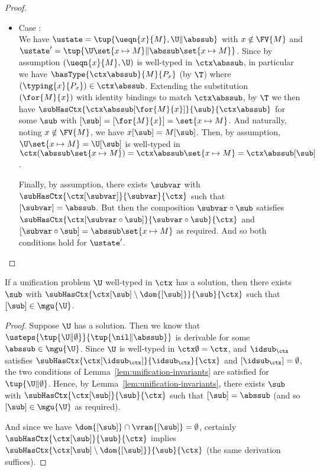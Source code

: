 \begin{proof}
\begin{itemize}
  \item Case : \\
  We have $\ustate = \tup{\ueqn{x}{M}, \U \| \abssub}$ with $x \notin \FV{M}$ and $\ustate' = \tup{\U \set{x \mapsto M} \| \abssub \set{x \mapsto M}}$.
  Since by assumption $(\ueqn{x}{M}, \U)$ is well-typed in $\ctx \abssub$, in particular we have $\hasType{\ctx \abssub}{M}{P_x}$ (by $\T$) where $(\typing{x}{P_x}) \in \ctx \abssub$.
  Extending the substitution $(\for{M}{x})$ with identity bindings to match $\ctx \abssub$, by $\T$ we then have $\subHasCtx{\ctx \abssub [\for{M}{x}]}{\sub}{\ctx \abssub}$ for some $\sub$ with $[\sub] = [\for{M}{x}] = \set{x \mapsto M}$.
  And naturally, noting $x \notin \FV{M}$, we have $x[\sub] = M[\sub]$.
  Then, by assumption, $\U \set{x \mapsto M} = \U[\sub]$ is well-typed in $\ctx (\abssub \set{x \mapsto M}) = \ctx \abssub \set{x \mapsto M} = \ctx \abssub [\sub]$.
  
  Finally, by assumption, there exists $\subvar$ with $\subHasCtx{\ctx[\subvar]}{\subvar}{\ctx}$ such that $[\subvar] = \abssub$.
  But then the composition $\subvar \circ \sub$ satisfies $\subHasCtx{\ctx[\subvar \circ \sub]}{\subvar \circ \sub}{\ctx}$ and $[\subvar \circ \sub] = \abssub \set{x \mapsto M}$ as required.
  And so both conditions hold for $\ustate'$.
\end{itemize}
\end{proof}

\begin{lemma}
\label{lem:unification-existence}
If a unification problem $\U$ well-typed in $\ctx$ has a solution, then there exists $\sub$ with $\subHasCtx{\ctx[\sub] \setminus \dom{[\sub]}}{\sub}{\ctx}$ such that $[\sub] \in \mgu{\U}$.
\end{lemma}

\begin{proof}
Suppose $\U$ has a solution.
Then we know that $\usteps{\tup{\U \| \emptyset}}{\tup{\nil \| \abssub}}$ is derivable for some $\abssub \in \mgu{\U}$.
Since $\U$ is well-typed in $\ctx \emptyset = \ctx$, and $\idsub_{\ctx}$ satisfies $\subHasCtx{\ctx[\idsub_{\ctx}]}{\idsub_{\ctx}}{\ctx}$ and $[\idsub_{\ctx}] = \emptyset$, the two conditions of Lemma~\ref{lem:unification-invariants} are satisfied for $\tup{\U \| \emptyset}$.
Hence, by Lemma~\ref{lem:unification-invariants}, there exists $\sub$ with $\subHasCtx{\ctx[\sub]}{\sub}{\ctx}$ such that $[\sub] = \abssub$ (and so $[\sub] \in \mgu{\U}$ as required).

And since we have $\dom{[\sub]} \cap \vran{[\sub]} = \emptyset$, certainly $\subHasCtx{\ctx[\sub]}{\sub}{\ctx}$ implies $\subHasCtx{\ctx[\sub] \setminus \dom{[\sub]}}{\sub}{\ctx}$ (the same derivation suffices).
\end{proof}

